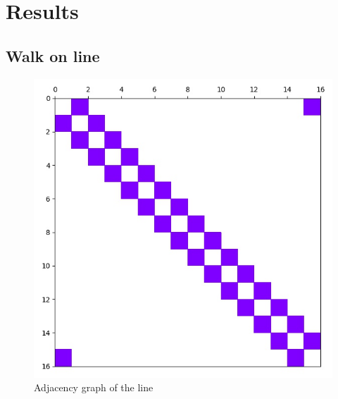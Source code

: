 \chapter{Results}

\section{Walk on line}


\begin{figure}[H]
\centering
\includegraphics[width=0.5\linewidth]{./figures/results/path/graph.jpg}
\caption{Adjacency graph of the line}
\end{figure}

